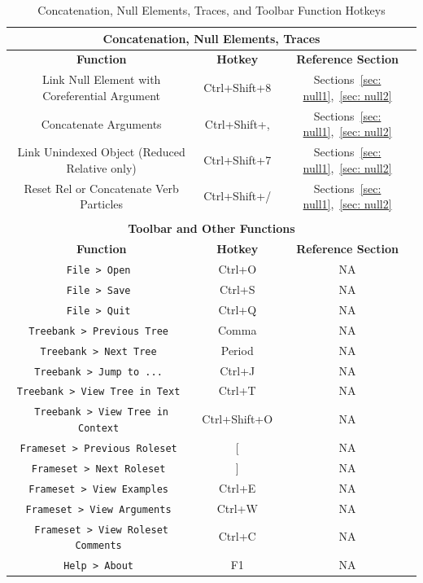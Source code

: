 \documentclass[11pt]{report}
\begin{document}
\pagebreak

\begin{table}[htdp]
\centering
\begin{tabular}{|c|c|c|}
\hline \multicolumn{3}{|c|}{\textbf{Concatenation, Null Elements, Traces}} \\
\hline \textbf{Function} & \textbf{Hotkey} & \textbf{Reference Section} \\
\hline Link Null Element with Coreferential Argument & Ctrl+Shift+8 & Sections~\ref{sec: null1},~\ref{sec: null2} \\
\hline Concatenate Arguments & Ctrl+Shift+, & Sections~\ref{sec: null1},~\ref{sec: null2} \\
\hline Link Unindexed Object (Reduced Relative only) & Ctrl+Shift+7 & Sections~\ref{sec: null1},~\ref{sec: null2} \\
\hline Reset Rel or Concatenate Verb Particles & Ctrl+Shift+/ & Sections~\ref{sec: null1},~\ref{sec: null2} \\
\hline \multicolumn{3}{c}{} \\
\hline \multicolumn{3}{|c|}{\textbf{Toolbar and Other Functions}} \\
\hline \textbf{Function} & \textbf{Hotkey} & \textbf{Reference Section} \\
\hline \tt File > Open & Ctrl+O & NA \\
\hline \tt File > Save & Ctrl+S & NA \\
\hline \tt File > Quit & Ctrl+Q & NA \\
\hline \tt Treebank > Previous Tree & Comma & NA \\
\hline \tt Treebank > Next Tree & Period & NA \\
\hline \tt Treebank > Jump to ... & Ctrl+J & NA \\
\hline \tt Treebank > View Tree in Text & Ctrl+T & NA \\
\hline \tt Treebank > View Tree in Context & Ctrl+Shift+O & NA \\
\hline \tt Frameset > Previous Roleset & [ & NA \\
\hline \tt Frameset > Next Roleset & ] & NA \\
\hline \tt Frameset > View Examples & Ctrl+E & NA \\
\hline \tt Frameset > View Arguments & Ctrl+W & NA \\
\hline \tt Frameset > View Roleset Comments & Ctrl+C & NA \\
\hline \tt Help > About & F1 & NA \\
\hline 
\end{tabular}
\label{tbl: JubHotkeys2}
\caption{Concatenation, Null Elements, Traces, and Toolbar Function Hotkeys}
\end{table} 

\pagebreak


\end{document}
